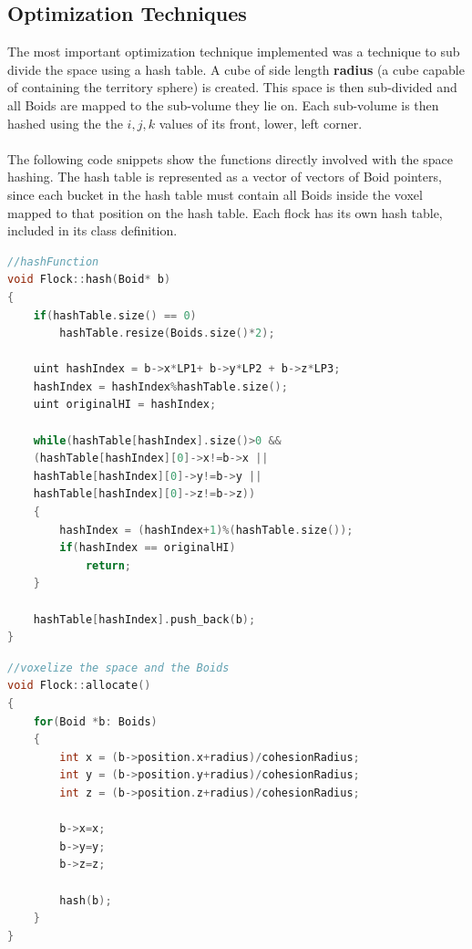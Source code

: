 \documentclass[12pt]{article}
\begin{document}
\subsection{Optimization Techniques}
The most important optimization technique implemented was a technique to sub divide the space using a hash table. A cube of side length \textbf{radius} (a cube capable of containing the territory sphere) is created. This space is then sub-divided and all Boids are mapped to the sub-volume they lie on. Each sub-volume is then hashed using the the $i,j,k$ values of its front, lower, left corner.
\\ \\
\noindent The following code snippets show the functions directly involved with the space hashing. The hash table is represented as a vector of vectors of Boid pointers, since each bucket in the hash table must contain all Boids inside the voxel mapped to that position on the hash table. Each flock has its own hash table, included in its class definition.

\begin{minipage}[t]{\textwidth}
\begin{lstlisting}[language=C++]
//hashFunction
void Flock::hash(Boid* b)
{
	if(hashTable.size() == 0)
		hashTable.resize(Boids.size()*2);
	
	uint hashIndex = b->x*LP1+ b->y*LP2 + b->z*LP3;
	hashIndex = hashIndex%hashTable.size();
	uint originalHI = hashIndex;
	
	while(hashTable[hashIndex].size()>0 &&
	(hashTable[hashIndex][0]->x!=b->x ||
	hashTable[hashIndex][0]->y!=b->y ||
	hashTable[hashIndex][0]->z!=b->z))
	{
		hashIndex = (hashIndex+1)%(hashTable.size());
		if(hashIndex == originalHI)
			return;
	}

	hashTable[hashIndex].push_back(b);
}
\end{lstlisting}
\end{minipage}

\begin{minipage}[t]{\textwidth}
\begin{lstlisting}[language=C++]
//voxelize the space and the Boids
void Flock::allocate()
{
	for(Boid *b: Boids)
	{
		int x = (b->position.x+radius)/cohesionRadius;
		int y = (b->position.y+radius)/cohesionRadius;
		int z = (b->position.z+radius)/cohesionRadius;
		
		b->x=x;
		b->y=y;
		b->z=z;
		
		hash(b);
	}
}
\end{lstlisting}
\end{minipage}
\end{document}
